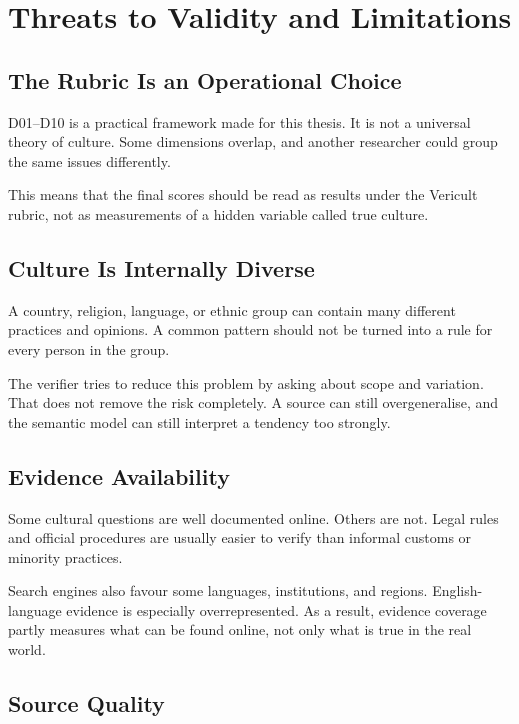 \chapter{Threats to Validity and Limitations}
\label{chap:limitations}

\section{The Rubric Is an Operational Choice}

D01--D10 is a practical framework made for this thesis. It is not a universal theory of culture. Some dimensions overlap, and another researcher could group the same issues differently.

This means that the final scores should be read as results under the Vericult rubric, not as measurements of a hidden variable called true culture.

\section{Culture Is Internally Diverse}

A country, religion, language, or ethnic group can contain many different practices and opinions. A common pattern should not be turned into a rule for every person in the group.

The verifier tries to reduce this problem by asking about scope and variation. That does not remove the risk completely. A source can still overgeneralise, and the semantic model can still interpret a tendency too strongly.

\section{Evidence Availability}

Some cultural questions are well documented online. Others are not. Legal rules and official procedures are usually easier to verify than informal customs or minority practices.

Search engines also favour some languages, institutions, and regions. English-language evidence is especially overrepresented. As a result, evidence coverage partly measures what can be found online, not only what is true in the real world.

\section{Source Quality}

